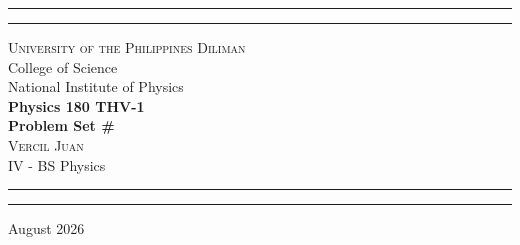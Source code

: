 \begin{titlepage}
    \vspace*{2.5in}
    \hrule
    \vspace{3pt}
    \hrule
    \vspace{0.25in}
    \begin{center}
		{
			\Large 
			\textsc{
				University of the Philippines Diliman
			}
			\\[4pt]
			College of Science
			\\[4pt]
			National Institute of Physics
		}
		\\[0.5cm]
		{
			\Huge
			\textbf{
				Physics 180 THV-1
				\\[5pt]
				Problem Set \#
			}
		}
		\\[0.75cm]
		{
			\Large 
			\textsc{
				Vercil Juan
			}
		}\\[5pt] 
		{
			\large 
			IV - BS Physics
		}
    \end{center}
    \vspace{0.25in}
    \hrule
    \vspace{3pt}
    \hrule 
    \vfill
    \begin{center}
    {\large 
		August 2026
	}
    \end{center}
\end{titlepage}

